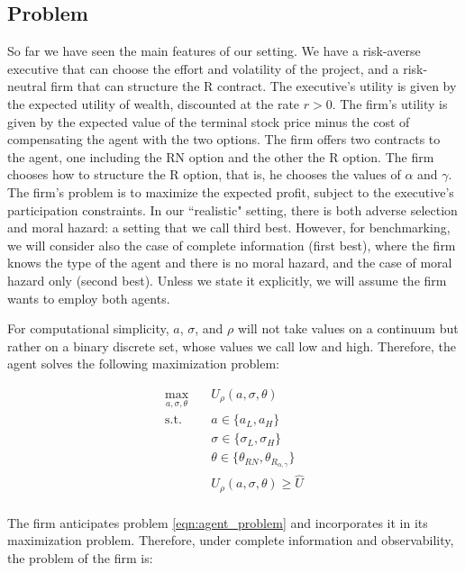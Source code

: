 \subsection{Problem}
So far we have seen the main features of our setting. We have a risk-averse executive that can choose the effort and volatility of the project, and a risk-neutral firm that can structure the R contract. The executive's utility is given by the expected utility of wealth, discounted at the rate $r>0$. The firm's utility is given by the expected value of the terminal stock price minus the cost of compensating the agent with the two options. The firm offers two contracts to the agent, one including the RN option and the other the R option. The firm chooses how to structure the R option, that is, he chooses the values of $\alpha$ and $\gamma$. The firm's problem is to maximize the expected profit, subject to the executive's participation constraints. In our ``realistic" setting, there is both adverse selection and moral hazard: a setting that we call third best. However, for benchmarking, we will consider also the case of complete information (first best), where the firm knows the type of the agent and there is no moral hazard, and the case of moral hazard only (second best). Unless we state it explicitly, we will assume the firm wants to employ both agents.

For computational simplicity, $a$, $\sigma$, and $\rho$ will not take values on a continuum but rather on a binary discrete set, whose values we call low and high. Therefore, the agent solves the following maximization problem:

\begin{equation}
    \label{eqn:agent_problem}
    \begin{aligned}
    \max_{a, \sigma, \theta} \quad & U_\rho (a, \sigma, \theta) \\
    \textrm{s.t.}       \quad & a \in \{ a_L, a_H \} \\
                        \quad & \sigma \in \{ \sigma_L, \sigma_H \} \\
                        \quad & \theta \in \{\theta_{RN}, \theta_{R_{\alpha, \gamma}} \} \\
                        \quad & U_\rho(a, \sigma, \theta) \ge \hat{U}  \\
    \end{aligned}
\end{equation}

The firm anticipates problem \ref*{eqn:agent_problem} and incorporates it in its maximization problem. Therefore, under complete information and observability, the problem of the firm is:

